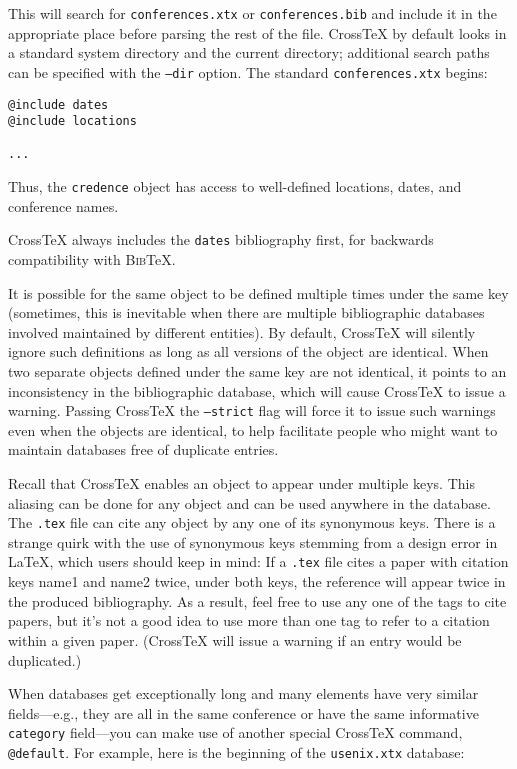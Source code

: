 \documentclass{article}
\newcommand{\XTeX}{Cross\TeX}
\newcommand{\BibTeX}{\textsc{Bib}\TeX}
\begin{document}
This will search for \texttt{conferences.xtx} or \texttt{conferences.bib} and include it in the appropriate place before parsing the rest of the file. \XTeX{} by default looks in a standard system directory and the current directory; additional search paths can be specified with the \texttt{--dir} option. The standard \texttt{conferences.xtx} begins:

\begin{small}\begin{verbatim}
@include dates
@include locations

...
\end{verbatim}\end{small}

Thus, the \texttt{credence} object has access to well-defined locations, dates, and conference names.

\XTeX{} always includes the \texttt{dates} bibliography first, for backwards compatibility with \BibTeX{}.

It is possible for the same object to be defined multiple times under the 
same key (sometimes, this is inevitable when there are multiple bibliographic
databases involved maintained by different entities). By default, \XTeX{}
will silently ignore such definitions as long as all versions of the object
are identical. When two separate objects defined under the same key are not
identical, it points to an inconsistency in the bibliographic database, which
will cause \XTeX{} to issue a warning. Passing \XTeX{} the \texttt{--strict} flag will force it to issue such warnings even when the objects are identical,
to help facilitate people who might want to maintain databases free of
duplicate entries.

Recall that \XTeX{} enables an object to appear under multiple keys. 
This aliasing can be done for any object and can be used anywhere in
the database. The \texttt{.tex} file can cite any object by any one of
its synonymous keys. There is a strange quirk with the use of
synonymous keys stemming from a design error in LaTeX, which users
should keep in mind: If a \texttt{.tex} file cites a paper with
citation keys name1 and name2 twice, under both keys, the reference
will appear twice in the produced bibliography. As a result, feel free
to use any one of the tags to cite papers, but it's not a good idea to
use more than one tag to refer to a citation within a given paper.
(\XTeX{} will issue a warning if an entry would be duplicated.)

When databases get exceptionally long and many elements have very similar fields---e.g., they are all in the same conference or have the same informative \texttt{category} field---you can make use of another special \XTeX{} command, \texttt{@default}. For example, here is the beginning of the \texttt{usenix.xtx} database:
\end{document}
